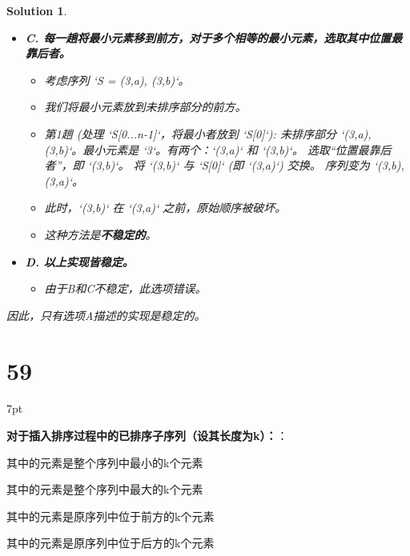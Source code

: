 \documentclass[UTF8]{report}
\newtheorem{solution}{Solution}
\theoremstyle{MyLineTheoremStyle} %
\theoremstyle{MyBlockTheoremStyle} %
\theoremstyle{MySubsubsectionStyle} %
\newenvironment{graybox}{%
        \def\FrameCommand{%
        \hspace{1pt}%
        {\color{gray}\small \vrule width 2pt}%
        {\color{graybox_color}\vrule width 4pt}%
        \colorbox{graybox_color}%
        }%
        \MakeFramed{\advance\hsize-\width\FrameRestore}%
        \noindent\hspace{-4.55pt}%
        \begin{adjustwidth}{}{7pt}%
        \vspace{2pt}\vspace{2pt}%
        }
        {%
        \vspace{2pt}\end{adjustwidth}\endMakeFramed%
        }
\begin{document}
\begin{solution}
\begin{itemize}
    \item \textbf{C. 每一趟将最小元素移到前方，对于多个相等的最小元素，选取其中位置最靠后者。}
    \begin{itemize}
        \item 考虑序列 `S = {(3,a), (3,b)}`。
        \item 我们将最小元素放到未排序部分的前方。
        \item 第1趟 (处理 `S[0...n-1]`，将最小者放到 `S[0]`):
        未排序部分 `{(3,a), (3,b)}`。最小元素是 `3`。有两个：`(3,a)` 和 `(3,b)`。
        选取“位置最靠后者”，即 `(3,b)`。
        将 `(3,b)` 与 `S[0]` (即 `(3,a)`) 交换。
        序列变为 `{(3,b), (3,a)}`。
        \item 此时，`(3,b)` 在 `(3,a)` 之前，原始顺序被破坏。
        \item 这种方法是\textbf{不稳定的}。
    \end{itemize}

    \item \textbf{D. 以上实现皆稳定。}
    \begin{itemize}
        \item 由于B和C不稳定，此选项错误。
    \end{itemize}
\end{itemize}
因此，只有选项A描述的实现是稳定的。
\end{solution}


\section*{59}

\begin{graybox}
\textbf{对于插入排序过程中的已排序子序列（设其长度为k）：}：
\begin{circledenum}
    \item 其中的元素是整个序列中最小的k个元素
    \item 其中的元素是整个序列中最大的k个元素
    \item 其中的元素是原序列中位于前方的k个元素
    \item 其中的元素是原序列中位于后方的k个元素
\end{circledenum}
\end{graybox}
\end{document}
